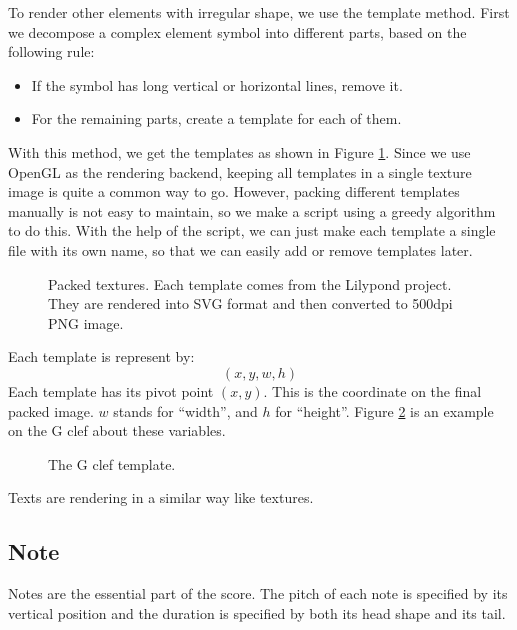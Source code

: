 To render other elements with irregular shape, we use the template method. First we decompose a complex element symbol into different parts, based on the following rule:
\begin{itemize}
    \item If the symbol has long vertical or horizontal lines, remove it.
    \item For the remaining parts, create a template for each of them.
\end{itemize}
With this method, we get the templates as shown in Figure \ref{fig:primitive-texture}. Since we use OpenGL as the rendering backend, keeping all templates in a single texture image is quite a common way to go. However, packing different templates manually is not easy to maintain, so we make a script using a greedy algorithm to do this. With the help of the script, we can just make each template a single file with its own name, so that we can easily add or remove templates later.

\begin{figure}[t]
    \begin{center}
    \end{center}
    \caption{Packed textures. Each template comes from the Lilypond project. They are rendered into SVG format and then converted to 500dpi PNG image.}
    \label{fig:primitive-texture}
\end{figure}

Each template is represent by:
\[
    (x, y, w, h)
\]
Each template has its pivot point $(x, y)$. This is the coordinate on the final packed image. $w$ stands for ``width'', and $h$ for ``height''. Figure \ref{fig:primitive-example-clef-G} is an example on the G clef about these variables.

\begin{figure}[t]
    \begin{center}
    \end{center}
    \caption{The G clef template.}
    \label{fig:primitive-example-clef-G}
\end{figure}

Texts are rendering in a similar way like textures.

\subsection{Note}
Notes are the essential part of the score. The pitch of each note is specified by its vertical position and the duration is specified by both its head shape and its tail.

